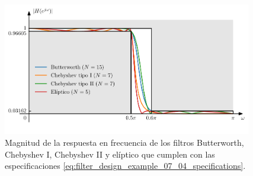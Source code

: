 \documentclass[a4paper]{report}
\begin{document}
\begin{figure}[!htb]
 \begin{center}
 \includegraphics[width=0.97\textwidth]{figuras/filter_design_example_07_04_specifications.pdf}
 \caption{\label{fig:filter_design_example_07_04_specifications} Magnitud de la respuesta en frecuencia de los filtros Butterworth, Chebyshev I, Chebyshev II y elíptico que cumplen con las especificaciones \ref{eq:filter_design_example_07_04_specifications}.}
 \end{center}
\end{figure}
 
\end{document}
